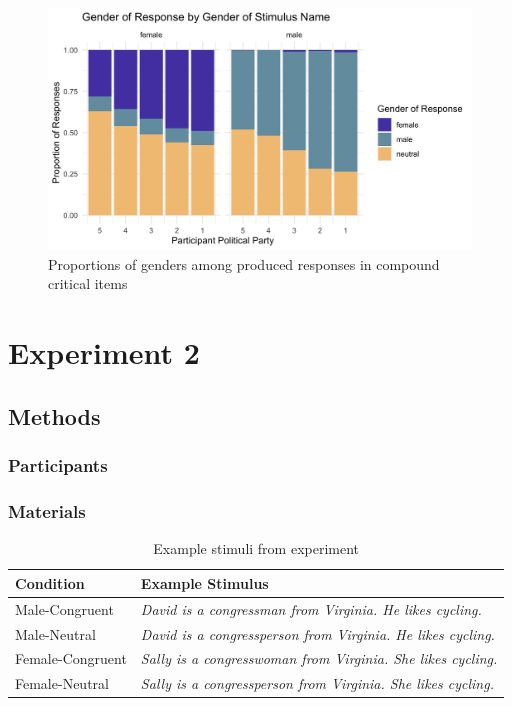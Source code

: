 \documentclass{article}
\begin{document}
	\begin{figure}[h!]
	\centering
	\includegraphics[scale=0.2]{prod_comp_ideo.png}
	\caption{Proportions of genders among produced responses in compound critical items}
	\end{figure}
	
	\newpage
	\section{Experiment 2}
	
	\subsection{Methods}
	
	\subsubsection{Participants}
	
	\subsubsection{Materials}
	
	\begin{table}[h!]
		\centering
		\begin{tabular}{l|l}
			\textbf{Condition} & \textbf{Example Stimulus}\\
			\hline
			Male-Congruent & \textit{David is a congressman from Virginia. He likes cycling.} \\
			Male-Neutral & \textit{David is a congressperson from Virginia. He likes cycling.} \\
			Female-Congruent & \textit{Sally is a congresswoman from Virginia. She likes cycling.}\\
			Female-Neutral & \textit{Sally is a congressperson from Virginia. She likes cycling.}
		\end{tabular}
		\caption{Example stimuli from experiment}
		\label{Table1}
	\end{table}
	
\end{document}
